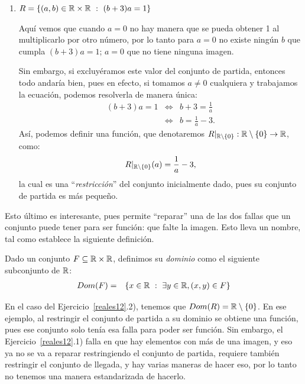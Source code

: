 \begin{ejercicio}
\begin{enumerate}
  \item[2)] $R=\{(a,b)\in\R\times\R\ :\ (b+3)a=1\}$

    Aquí vemos que cuando $a=0$ no hay manera que se pueda obtener 1 al multiplicarlo por otro número, por lo tanto para $a=0$ no existe ningún $b$ que cumpla $(b+3)a=1$; $a=0$ que no tiene ninguna imagen.
    
    Sin embargo, si excluyéramos este valor del conjunto de partida, entonces todo andaría bien, pues en efecto, si tomamos $a\not=0$ cualquiera y trabajamos la ecuación, podemos resolverla de manera única:
    \begin{eqnarray*}
    (b+3)a=1 &\Leftrightarrow& b+3=\frac{1}{a}\\
    &\Leftrightarrow&b=\frac{1}{a}-3.
    \end{eqnarray*} 
Así, podemos definir una función, que denotaremos $R|_{\mathbb{R}\setminus\{0\}}:\mathbb{R}\setminus\{0\}\rightarrow \mathbb{R}$, como:
$$ R|_{\mathbb{R}\setminus\{0\}}(a)=\frac{1}{a}-3,$$
la cual es una ``\emph{restricción}'' del conjunto inicialmente dado, pues su conjunto de partida es más pequeño.
\end{enumerate}
\end{ejercicio}

Esto último es interesante, pues permite ``reparar'' una de las dos fallas que un conjunto puede tener para ser función: que falte la imagen.  Esto lleva un nombre, tal como establece la siguiente definición.

\vspace{.2cm}


\begin{defn}
Dado un conjunto $F\subseteq\mathbb{R}\times\mathbb{R}$, definimos su \emph{dominio} como el siguiente subconjunto de $\mathbb{R}$:
\begin{eqnarray*}
Dom(F)&=&\{x\in \mathbb{R}\ :\ \exists y\in\mathbb{R}, (x,y)\in F\}
\end{eqnarray*}
\end{defn}

En el caso del Ejercicio~\ref{reales12}.2), tenemos que $Dom(R)=\mathbb{R}\setminus\{0\}$.
En ese ejemplo, al restringir el conjunto de partida a su dominio se obtiene una función, pues ese conjunto solo tenía esa falla para poder ser función.
Sin embargo, el Ejercicio~\ref{reales12}.1) falla en que hay elementos con más de una imagen, y eso ya no se va a reparar restringiendo el conjunto de partida, requiere también restringir el conjunto de llegada, y hay varias maneras de hacer eso, por lo tanto no tenemos una manera estandarizada de hacerlo. 

